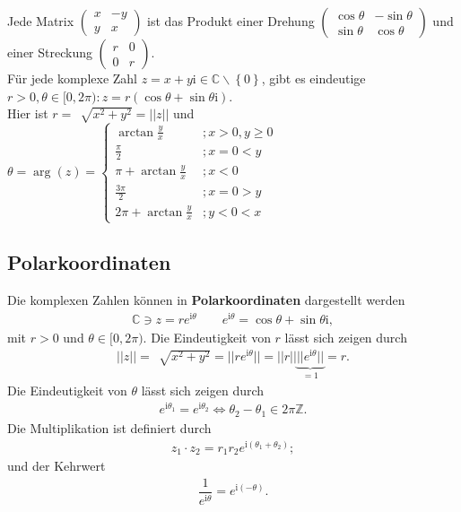 \documentclass[a4paper,12pt]{article}
\numberwithin{equation}{section}
\begin{document}
Jede Matrix $\begin{pmatrix}
        x&-y\\y&x
\end{pmatrix}$ ist das Produkt einer Drehung $\begin{pmatrix}
        \cos \theta &-\sin \theta \\\sin \theta &\cos \theta  
\end{pmatrix}$ und einer Streckung $\begin{pmatrix}
        r&0\\0&r
\end{pmatrix}$.\\
Für jede komplexe Zahl $z=x+y\text{i} \in \mathbb{C}\backslash \left\{0\right\}$, gibt es eindeutige $r>0,\theta  \in [0,2\pi):z=r\left(\cos \theta +\sin \theta \text{i}\right)$.\\\indent
Hier ist $r=\,\sqrt[]{x^2+y^2}=| |z| |$ und $\theta =\arg\left(z\right)=\begin{cases}
        \arctan \tfrac{y}{x}&;x>0,y\geq 0\\
        \tfrac{\pi }{2}&;x=0<y\\
        \pi +\arctan \tfrac{y}{x}&;x<0\\
        \tfrac{3\pi }{2}&;x=0>y\\
        2\pi +\arctan \tfrac{y}{x}&;y<0<x
\end{cases}$ 

\subsection{Polarkoordinaten}
Die komplexen Zahlen können in \textbf{Polarkoordinaten} dargestellt werden
\begin{align} 
        \mathbb{C}\ni z=re^{\text{i}\theta }\qquad e^{\text{i}\theta }=\cos \theta +\sin \theta \text{i}
,\end{align} 
mit $r>0$ und $\theta  \in [0,2\pi )$. Die Eindeutigkeit von $r$ lässt sich zeigen durch
\begin{align} 
        ||z||=\,\sqrt[]{x^2+y^2}=||re^{\text{i}\theta }||=||r||\underbrace{||e^{\text{i}\theta }||}_{=1}=r
.\end{align} 
Die Eindeutigkeit von $\theta $ lässt sich zeigen durch
\begin{align} 
        e^{\text{i}\theta _1}=e^{\text{i}\theta _2}\Leftrightarrow \theta _2-\theta _1 \in 2\pi \mathbb{Z}
.\end{align} 
Die Multiplikation ist definiert durch
\begin{align} 
        z_1\cdot z_2=r_1r_2e^{\text{i}\left(\theta _1+\theta _2\right)}
;\end{align} 
und der Kehrwert
\begin{align} 
        \dfrac{1}{e^{\text{i}\theta }}=e^{\text{i}\left(-\theta \right)}
.\end{align} 
\end{document}
